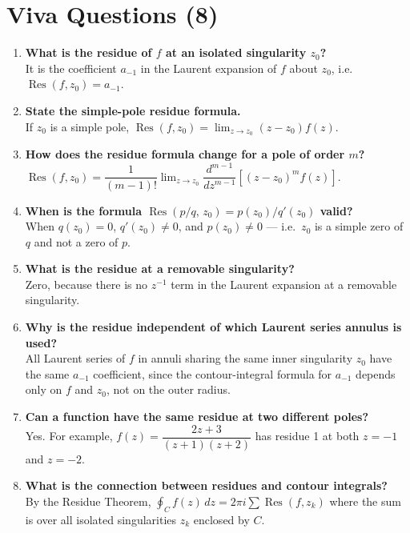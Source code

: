 \documentclass[12pt,a4paper]{article}
\begin{document}
\section{Viva Questions (8)}

\begin{enumerate}[leftmargin=*]
  \item \textbf{What is the residue of $f$ at an isolated singularity $z_0$?}\\
        It is the coefficient $a_{-1}$ in the Laurent expansion of $f$ about $z_0$,
        i.e.\ $\operatorname{Res}(f,z_0) = a_{-1}$.

  \item \textbf{State the simple-pole residue formula.}\\
        If $z_0$ is a simple pole, $\operatorname{Res}(f,z_0) = \lim_{z\to z_0}(z-z_0)f(z)$.

  \item \textbf{How does the residue formula change for a pole of order $m$?}\\
        $\operatorname{Res}(f,z_0) = \dfrac{1}{(m-1)!}\lim_{z\to z_0}
        \dfrac{d^{m-1}}{dz^{m-1}}\!\left[(z-z_0)^m f(z)\right].$

  \item \textbf{When is the formula $\operatorname{Res}(p/q,\, z_0) = p(z_0)/q'(z_0)$ valid?}\\
        When $q(z_0)=0$, $q'(z_0)\neq 0$, and $p(z_0)\neq 0$ --- i.e.\ $z_0$ is a simple
        zero of $q$ and not a zero of $p$.

  \item \textbf{What is the residue at a removable singularity?}\\
        Zero, because there is no $z^{-1}$ term in the Laurent expansion at a removable singularity.

  \item \textbf{Why is the residue independent of which Laurent series annulus is used?}\\
        All Laurent series of $f$ in annuli sharing the same inner singularity $z_0$ have the same
        $a_{-1}$ coefficient, since the contour-integral formula for $a_{-1}$ depends only on $f$
        and $z_0$, not on the outer radius.

  \item \textbf{Can a function have the same residue at two different poles?}\\
        Yes.  For example, $f(z) = \dfrac{2z+3}{(z+1)(z+2)}$ has residue 1 at both $z=-1$ and $z=-2$.

  \item \textbf{What is the connection between residues and contour integrals?}\\
        By the Residue Theorem, $\oint_C f(z)\,dz = 2\pi i \sum \operatorname{Res}(f, z_k)$
        where the sum is over all isolated singularities $z_k$ enclosed by $C$.
\end{enumerate}
\end{document}
